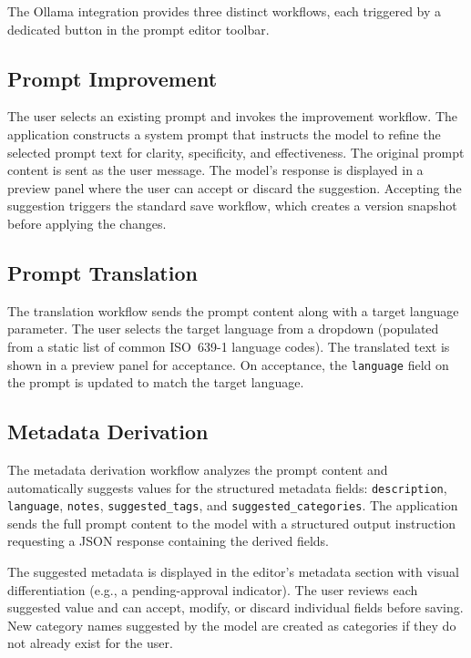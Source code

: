 \documentclass[a4paper, 11pt, oneside]{report}
\begin{document}
The Ollama integration provides three distinct workflows, each triggered
by a dedicated button in the prompt editor toolbar.

\subsection{Prompt Improvement}
\label{sec:ollama-improve}

The user selects an existing prompt and invokes the improvement workflow.
The application constructs a system prompt that instructs the model to
refine the selected prompt text for clarity, specificity, and
effectiveness.  The original prompt content is sent as the user message.
The model's response is displayed in a preview panel where the user can
accept or discard the suggestion.  Accepting the suggestion triggers the
standard save workflow, which creates a version snapshot before applying
the changes.

\subsection{Prompt Translation}
\label{sec:ollama-translate}

The translation workflow sends the prompt content along with a target
language parameter.  The user selects the target language from a dropdown
(populated from a static list of common ISO~639-1 language codes).  The
translated text is shown in a preview panel for acceptance.  On
acceptance, the \texttt{language} field on the prompt is updated to match
the target language.

\subsection{Metadata Derivation}
\label{sec:ollama-derive}

The metadata derivation workflow analyzes the prompt content and
automatically suggests values for the structured metadata fields:
\texttt{description}, \texttt{language}, \texttt{notes},
\texttt{suggested\_tags}, and \texttt{suggested\_categories}.  The application sends the full prompt content to
the model with a structured output instruction requesting a JSON response
containing the derived fields.

The suggested metadata is displayed in the editor's metadata section with
visual differentiation (e.g., a pending-approval indicator).  The user
reviews each suggested value and can accept, modify, or discard
individual fields before saving.  New category names suggested by the
model are created as categories if they do not already exist for the user.
\end{document}
